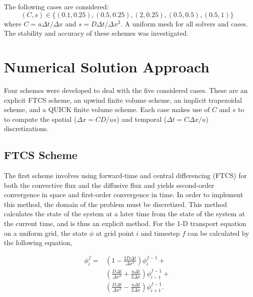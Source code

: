 \documentclass[twocolumn,10pt]{asme2ej}
\begin{document}
The following cases are considered:
\begin{equation*}
(C, s) \in \{(0.1, 0.25), (0.5, 0.25), (2, 0.25), (0.5, 0.5), (0.5, 1)\}
\end{equation*}
\noindent where $C = u\Delta t/\Delta x$ and $s = D\Delta t/\Delta x^2$. A uniform mesh for all solvers and cases. The stability and accuracy of these schemes was investigated.

\section{Numerical Solution Approach}

Four schemes were developed to deal with the five considered cases. These are an explicit FTCS scheme, an upwind finite volume scheme, an implicit trapezoidal scheme, and a QUICK finite volume scheme. Each case makes use of $C$ and $s$ to to compute the spatial ($\Delta x = C D / u s$) and temporal ($\Delta t = C \Delta x / u$) discretizations.

\subsection{FTCS Scheme}
The first scheme involves using forward-time and central differencing (FTCS) for both the convective flux and the diffusive flux and yields second-order convergence in space and first-order convergence in time. In order to implement this method, the domain of the problem must be discretized. This method calculates the state of the system at a later time from the state of the system at the current time, and is thus an explicit method. For the 1-D transport equation on a uniform grid, the state $\phi$ at grid point $i$ and timestep $f$ can be calculated by the following equation,

\begin{equation}
\label{ftcs_eqn}
\begin{split}
\phi_i ^f = & \left(1-\frac{2 D\Delta t}{\Delta x^2}\right) \phi_i ^{f-1} + \\
            & \left(\frac{D \Delta t}{\Delta x^2} + \frac{u \Delta t}{2 \Delta x}\right) \phi_{i-1} ^{f-1} + \\
            & \left(\frac{D \Delta t}{\Delta x^2} - \frac{u \Delta t}{2 \Delta x}\right) \phi_{i+1} ^{f-1}.
\end{split}
\end{equation}
\end{document}
